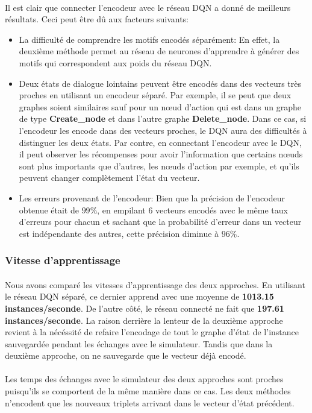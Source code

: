 \paragraph{}Il est clair que connecter l'encodeur avec le réseau DQN a donné de meilleurs résultats. Ceci peut être dû aux facteurs suivants:
\begin{itemize}
	\item La difficulté de comprendre les motifs encodés séparément: En effet, la deuxième méthode permet au réseau de neurones d'apprendre à générer des motifs qui correspondent aux poids du réseau DQN.
	\item Deux états de dialogue lointains peuvent être encodés dans des vecteurs très proches en utilisant un encodeur séparé. Par exemple, il se peut que deux graphes soient similaires sauf pour un n\oe{}ud d'action qui est dans un graphe de type \textbf{Create\_node} et dans l'autre graphe \textbf{Delete\_node}. Dans ce cas, si l'encodeur les encode dans des vecteurs proches, le DQN aura des difficultés à distinguer les deux états. Par contre, en connectant l'encodeur avec le DQN, il peut observer les récompenses pour avoir l'information que certains n\oe{}uds sont plus importants que d'autres, les n\oe{}uds d'action par exemple, et qu'ils peuvent changer complètement l'état du vecteur.
	\item Les erreurs provenant de l'encodeur: Bien que la précision de l'encodeur obtenue était de $99\%$, en empilant 6 vecteurs encodés avec le même taux d'erreurs pour chacun et sachant que la probabilité d'erreur dans un vecteur est indépendante des autres, cette précision diminue à $96\%$.
\end{itemize}
\subsubsection{Vitesse d'apprentissage}
\paragraph{}Nous avons comparé les vitesses d'apprentissage des deux approches. En utilisant le réseau DQN séparé, ce dernier apprend avec une moyenne de \textbf{1013.15 instances/seconde}. De l'autre côté, le réseau connecté ne fait que \textbf{197.61 instances/seconde}. La raison derrière la lenteur de la deuxième approche revient à la nécéssité de refaire l'encodage de tout le graphe d'état de l'instance sauvegardée pendant les échanges avec le simulateur. Tandis que dans la deuxième approche, on ne sauvegarde que le vecteur déjà encodé.\\\\
Les temps des échanges avec le simulateur des deux approches sont proches puisqu'ils se comportent de la même manière dans ce cas. Les deux méthodes n'encodent que les nouveaux triplets arrivant dans le vecteur d'état précédent. 
